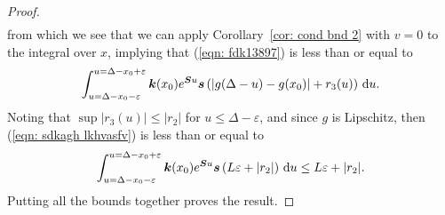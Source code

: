 \begin{proof}
\begin{align}
 	\end{align}
 	from which we see that we can apply Corollary~\ref{cor: cond bnd 2} with \(v=0\) to the integral over \(x\), implying that (\ref{eqn: fdk13897}) is less than or equal to
 	\begin{align}
 		\int_{u=\Delta-x_0-\varepsilon}^{u=\Delta-x_0+\varepsilon} \boldsymbol k(x_0) e^{\boldsymbol Su}\boldsymbol s\left(|g(\Delta-u)-g(x_0)|+r_3(u)\right)\, \mathrm{d} u. \label{eqn: sdkagh lkhvasfv}
 	\end{align}
 	Noting that \(\sup |r_3(u)|\leq|r_2|\) for \(u\leq \Delta-\varepsilon\), and since \(g\) is Lipschitz, then (\ref{eqn: sdkagh lkhvasfv}) is less than or equal to 
 	\begin{align}
 		\int_{u=\Delta-x_0-\varepsilon}^{u=\Delta-x_0+\varepsilon} \boldsymbol k(x_0) e^{\boldsymbol Su}\boldsymbol s\left(L\varepsilon+|r_2|\right)\, \mathrm{d} u \leq L\varepsilon+|r_2|. \label{eqn: sdkagh lsfv}
 	\end{align}
 	Putting all the bounds together proves the result. 
 \end{proof}

